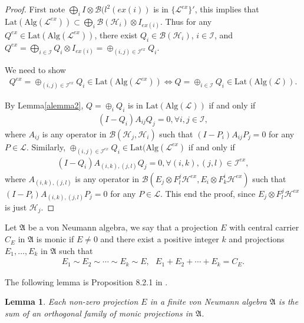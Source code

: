 \documentclass{amsart}
\newcommand{\AAA}{\mathfrak A}
\newcommand{\B}{\mathcal B}
\newcommand{\HHH}{\mathcal H} %
\newcommand{\LLL}{\mathcal L} %
\newcommand{\Lat}{\mathrm{Lat}}
\newcommand{\Alg}{\mathrm{Alg}}
\newtheorem{lemma}{Lemma}[section]
\begin{document}
\begin{proof}
First note $\bigoplus_{i} I \otimes \B(l^{2}(ex(i))$ is in $\{\LLL^{ex}\}'$, this implies that $\Lat(\Alg(\LLL^{ex})) \subset 
\bigoplus_{i} \B(\HHH_i) \otimes I_{ex(i)}$. Thus for any 
$Q^{ex} \in \Lat(\Alg(\LLL^{ex}))$, there exist $Q_i \in \B(\HHH_i)$, $i \in \mathcal{I}$, and $
Q^{ex} = \bigoplus_{i \in \mathcal{I}} Q_{i} \otimes I_{ex(i)} = \oplus_{(i,j) \in \mathcal{I}^{ex}} Q_{i}$.

We need to show 
\begin{align*}
Q^{ex} = \oplus_{(i,j) \in \mathcal{I}^{ex}} Q_{i} \in \Lat(\Alg(\LLL^{ex})) \Longleftrightarrow
Q = \oplus_{i \in \mathcal{I}} Q_{i}  \in \Lat(\Alg(\LLL)).
\end{align*}

By Lemma\ref{alemma2}, $Q =\oplus_{i} Q_{i}$ is in $\Lat(\Alg(\LLL))$ if and only if 
\begin{align*}
(I - Q_{i})A_{i j}Q_{j} = 0, \forall i, j \in \mathcal{I},
\end{align*}
where $A_{i j}$ is any operator in $\B(\HHH_{j}, \HHH_{i})$ such that 
$(I-P_{i})A_{i j}P_{j} = 0$ for any $P \in \LLL$.
Similarly,  $\oplus_{(i,j) \in \mathcal{I}^{ex}} Q_{i} \in \Lat(\Alg(\LLL^{ex})$ if and only if 
\begin{align*}
(I - Q_{i})A_{(i,k),(j,l)}Q_{j} = 0, \forall (i,k), (j,l) \in \mathcal{I}^{ex},
\end{align*}
where $A_{(i,k),(j,l)}$ is any operator in $\B(E_{j} \otimes F_{l}^{j}\HHH^{ex}, E_{i} \otimes F_{k}^{i}\HHH^{ex})$ such that 
$(I-P_{i})A_{(i,k),(j,l)}P_{j} = 0$ for any $P \in \LLL$. This end the proof, since $E_{j} \otimes F_{l}^{j}\HHH^{ex}$ is just $\HHH_{j}$.
\end{proof}

Let $\AAA$ be a von Neumann algebra, we say that a projection $E$ with central carrier $C_{E}$ in $\AAA$ is
monic if $E \neq 0$ and there exist a positive integer $k$ and projections $E_1, \ldots , E_k$ in $\AAA$
such that
\begin{align*}
E_1 \sim E_2 \sim \cdots \sim E_k \sim E , \mbox{   } E_1 + E_2 + \cdots + E_k = C_{E}.
\end{align*}

The following lemma is Proposition 8.2.1 in \cite{RK}.
\begin{lemma}\label{alemma4}
Each non-zero projection $E$ in a finite von Neumann algebra $\AAA$ is the sum of an orthogonal family
of monic projections in $\AAA$.
\end{lemma}
\end{document}
